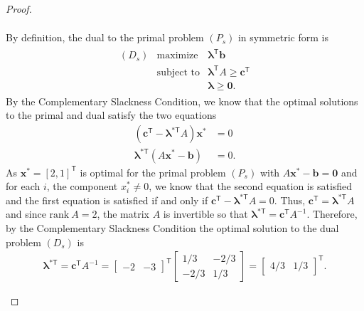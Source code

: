 \documentclass[12pt]{article}
\theoremstyle{definition}
\newcommand{\vc}[1]{\boldsymbol{#1}}
\newcommand{\tran}{\mathsf{T}}
\begin{document}
\begin{proof}
\begin{enumerate}
\begin{align*}
      \end{align*}
      By definition, the dual to the primal problem $(P_s)$ in symmetric form is
      \begin{align*}
        \begin{array}{rrl}
          (D_s) & \text{maximize} & \vc{\lambda}^\tran\vc{b}  \\
          & \text{subject to} & \vc{\lambda}^\tran A\geq \vc{c}^\tran\\
          & & \vc{\lambda} \geq \vc{0}.
        \end{array}
      \end{align*}
      By the Complementary Slackness Condition, we know that the optimal solutions to the primal and dual satisfy
      the two equations
      \begin{align*}
        (\vc{c}^\tran - \vc{\lambda}^{*\tran} A)\vc{x}^{*} &= 0 \\
        \vc{\lambda}^{*\tran}(A\vc{x}^{*} - \vc{b}) &= 0.
      \end{align*}
      As $\vc{x}^{*} = [2,1]^\tran$ is optimal for the primal problem $(P_s)$ with $A\vc{x}^{*} - \vc{b} = \vc{0}$
      and for each $i$, the component $x_i^{*} \neq 0$,
      we know that the second equation is satisfied and the first equation is satisfied if
      and only if $\vc{c}^\tran - \vc{\lambda}^{*\tran} A = 0$. Thus, $\vc{c}^\tran = \vc{\lambda}^{*\tran} A$ and since $\text{rank}\ A = 2$, the matrix $A$
      is invertible so that $\vc{\lambda}^{*\tran} = \vc{c}^\tran A^{-1}$. Therefore, by the Complementary Slackness Condition
      the optimal solution to the dual problem $(D_s)$ is
      \begin{align*}
        \vc{\lambda}^{*\tran} = \vc{c}^\tran A^{-1} = \begin{bmatrix}-2 & -3\end{bmatrix}^\tran\begin{bmatrix}1/3 & -2/3 \\ -2/3 & 1/3 \end{bmatrix} = \begin{bmatrix}4/3 & 1/3\end{bmatrix}^\tran.
      \end{align*}
  \end{enumerate}
\end{proof}
\newpage
\end{document}
